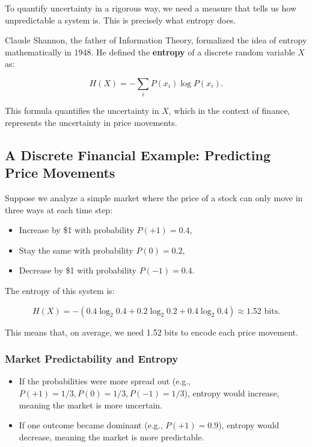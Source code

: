 To quantify uncertainty in a rigorous way, we need a measure that tells us how unpredictable a system is. This is precisely what entropy does.

Claude Shannon, the father of Information Theory, formalized the idea of entropy mathematically in 1948. He defined the \textbf{entropy} of a discrete random variable \(X\) as:

\[
H(X) = -\sum_{i} P(x_i) \log P(x_i).
\]

This formula quantifies the uncertainty in \(X\), which in the context of finance, represents the uncertainty in price movements. 

\subsection{A Discrete Financial Example: Predicting Price Movements}

Suppose we analyze a simple market where the price of a stock can only move in three ways at each time step:

\begin{itemize}
    \item Increase by \$1 with probability \( P(+1) = 0.4 \),
    \item Stay the same with probability \( P(0) = 0.2 \),
    \item Decrease by \$1 with probability \( P(-1) = 0.4 \).
\end{itemize}

The entropy of this system is:

\[
H(X) = - (0.4 \log_2 0.4 + 0.2 \log_2 0.2 + 0.4 \log_2 0.4) \approx 1.52 \text{ bits}.
\]

This means that, on average, we need 1.52 bits to encode each price movement.

\subsubsection*{Market Predictability and Entropy}

\begin{itemize}
    \item If the probabilities were more spread out (e.g., \( P(+1) = 1/3, P(0) = 1/3, P(-1) = 1/3 \)), entropy would increase, meaning the market is more uncertain.
    \item If one outcome became dominant (e.g., \( P(+1) = 0.9 \)), entropy would decrease, meaning the market is more predictable.
\end{itemize}

